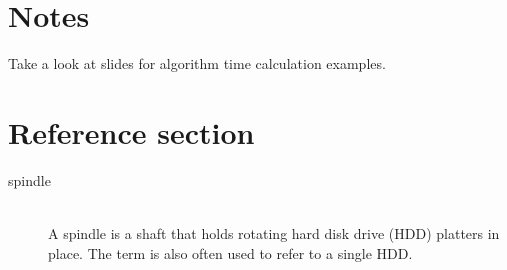\documentclass{article}
\begin{document}
\section{Notes}
\begin{flushleft}
Take a look at slides for algorithm time calculation examples.
\end{flushleft}

\pagebreak
\section*{Reference section} \label{sec:reference}
\begin{description}
	\item[spindle] \hfill \\ A spindle is a shaft that holds rotating hard disk drive (HDD) platters in place. The term is also often used to refer to a single HDD.
\end{description}
\end{document}
